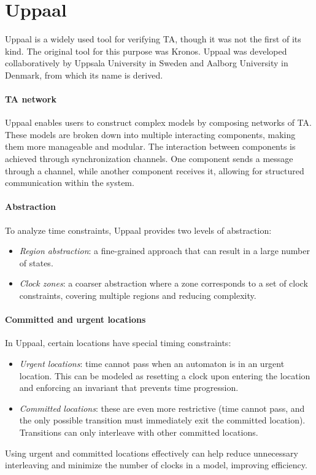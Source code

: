\section{Uppaal}

Uppaal is a widely used tool for verifying TA, though it was not the first of its kind. 
The original tool for this purpose was Kronos.
Uppaal was developed collaboratively by Uppsala University in Sweden and Aalborg University in Denmark, from which its name is derived. 

\paragraph*{TA network}
Uppaal enables users to construct complex models by composing networks of TA. 
These models are broken down into multiple interacting components, making them more manageable and modular.
The interaction between components is achieved through synchronization channels. 
One component sends a message through a channel, while another component receives it, allowing for structured communication within the system.

\paragraph*{Abstraction}
To analyze time constraints, Uppaal provides two levels of abstraction:
\begin{itemize}
    \item \textit{Region abstraction}: a fine-grained approach that can result in a large number of states.
    \item \textit{Clock zones}: a coarser abstraction where a zone corresponds to a set of clock constraints, covering multiple regions and reducing complexity.
\end{itemize}

\paragraph*{Committed and urgent locations}
In Uppaal, certain locations have special timing constraints:
\begin{itemize}
    \item \textit{Urgent locations}: time cannot pass when an automaton is in an urgent location. 
        This can be modeled as resetting a clock upon entering the location and enforcing an invariant that prevents time progression.
    \item \textit{Committed locations}: these are even more restrictive (time cannot pass, and the only possible transition must immediately exit the committed location). 
        Transitions can only interleave with other committed locations.
\end{itemize}
\noindent Using urgent and committed locations effectively can help reduce unnecessary interleaving and minimize the number of clocks in a model, improving efficiency.

